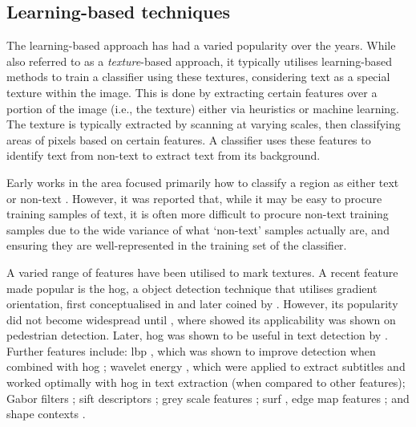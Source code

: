 \clearpage

\subsection{Learning-based techniques}
\label{sec:detection:learning}

The learning-based approach has had a varied popularity over the years. While also referred to as a \textit{texture}-based approach, it typically utilises learning-based methods to train a classifier using these textures, considering text as a special texture within the image. This is done by extracting certain features over a portion of the image (i.e., the texture) either via heuristics or machine learning. The texture is typically extracted by scanning at varying scales, then classifying areas of pixels based on certain features. A classifier uses these features to identify text from non-text to extract text from its background.

Early works in the area focused primarily how to classify a region as either text or non-text \citep{Sobottka:1999wi, Lienhart:2002ub, Li:2000uf, Kim:2003wj}. However, it was reported that, while it may be easy to procure training samples of text, it is often more difficult to procure non-text training samples \cite{Sung:1998vt,Heisele:2001ue} due to the wide variance of what `non-text' samples actually are, and ensuring they are well-represented in the training set of the classifier.

A varied range of features have been utilised to mark textures. A recent feature made popular is the \gls{hog}, a object detection technique that utilises gradient orientation, first conceptualised in \citep{McConnell:1986ws} and later coined by \citet{Freeman:1995uh}. However, its popularity did not become widespread until \citep{Dalal:2005jq}, where \citeauthor{Dalal:2005jq} showed its applicability was shown on pedestrian detection. Later, \gls{hog} was shown to be useful in text detection by \citet{Hanif:2008un}. Further features include: \gls{lbp} \citep{Ojala:1994hz}, which was shown to improve detection when combined with \gls{hog} \cite{Wang:2009wi}; wavelet energy \citep{Mohan:2001vb, Viola:2003ud}, which were applied to extract subtitles \citep{Gllavata:2004vq} and worked optimally with \gls{hog} in text extraction \citep{Pan:2010cj} (when compared to other features); Gabor filters \citep{Liu:2005et}; \gls{sift} descriptors \citep{Lowe:2004kp}; grey scale features \citep{Kim:2003wj}; \gls{surf} \cite{Bay:2008ud}, edge map features \cite{Chen:2004tj}; and shape contexts \citep{Belongie:2001uj}.

